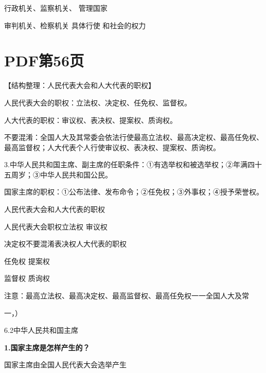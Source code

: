 \documentclass[lang=cn,11pt]{elegantbook}
\newcommand{\daofasym}[1]{{\daofasymbolfont #1}}
\newcommand{\daofasym}[1]{#1}
\begin{document}
行政机关、监察机关、 管理国家\par

审判机关、检察机关 具体行使 和社会的权力\par


\section*{PDF第56页}

【结构整理：人民代表大会和人大代表的职权】\par

人民代表大会的职权：立法权、决定权、任免权、监督权。\par

人大代表的职权：审议权、表决权、提案权、质询权。\par

不要混淆：全国人大及其常委会依法行使最高立法权、最高决定权、最高任免权、最高监督权；人大代表个人行使审议权、表决权、提案权、质询权。\par

3.中华人民共和国主席、副主席的任职条件：\daofasym{①}有选举权和被选举权；\daofasym{②}年满四十五周岁；\daofasym{③}中华人民共和国公民。\par

国家主席的职权：\daofasym{①}公布法律、发布命令；\daofasym{②}任免权；\daofasym{③}外事权；\daofasym{④}授予荣誉权。\par

人民代表大会和人大代表的职权\par

人民代表大会职权立法权 审议权\par

决定权不要混淆表决权人大代表的职权\par

任免权 提案权\par

监督权 质询权\par

注意：最高立法权、最高决定权、最高监督权、最高任免权一一全国人大及常\par

一，）\par

6.2中华人民共和国主席\par

\textbf{1.国家主席是怎样产生的？}\par

国家主席由全国人民代表大会选举产生\par
\end{document}
